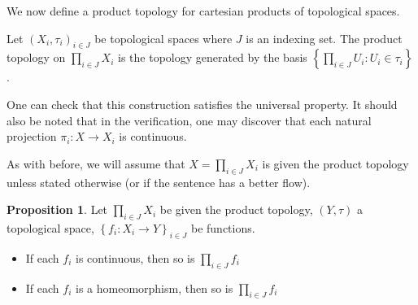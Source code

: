 \documentclass[12pt,reqno]{amsart}
\numberwithin{theorem}{section}
\theoremstyle{definition}
\theoremstyle{remark}
\numberwithin{equation}{section}
\newcommand{\set}[1]{\left \{ #1 \right \}}
\theoremstyle{definition}
\newtheorem{prop}[theorem]{Proposition}
\begin{document}
We now define a product topology for cartesian products of topological spaces.
\begin{definition}
    Let $(X_i,\tau_i)_{i \in J}$ be topological spaces where $J$ is an indexing set. The product topology on $\prod_{i \in J} X_i$ is the topology generated by the basis $\set{\prod_{i \in J} U_i : U_i \in \tau_i}$.
\end{definition}
One can check that this construction satisfies the universal property. It should also be noted that in the verification, one may discover that each natural projection $\pi_i:X \rightarrow X_i$ is continuous.

As with before, we will assume that $X=\prod_{i \in J} X_i$ is given the product topology unless stated otherwise (or if the sentence has a better flow).
\begin{prop}
    Let $\prod_{i \in J} X_i$ be given the product topology, $(Y,\tau)$ a topological space, $\set{f_i:X_i\rightarrow Y}_{i \in J}$ be functions.
    \begin{itemize}
        \item If each $f_i$ is continuous, then so is $\prod_{i\in J} f_i$
        \item If each $f_i$ is a homeomorphism, then so is $\prod_{i\in J} f_i$
    \end{itemize}
\end{prop}
\end{document}
